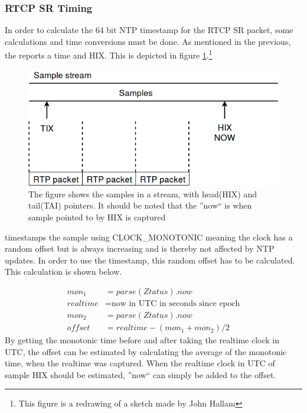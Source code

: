 \subsubsection{RTCP SR Timing} \label{sec:design:rtcpsr}
In order to calculate the 64 bit NTP timestamp for the RTCP SR packet, some calculations and time conversions must be done. As mentioned in the previous, the  reports a time and \ac{HIX}. This is depicted in figure \ref{fig:implementation:rtcpsr}.\footnote{This figure is a redrawing of a sketch made by John Hallam}
\begin{figure}[H]
	\centering
	\includegraphics[width=\textwidth]{figures/rtcp_sr_timing}
	\caption{The figure shows the samples in a stream, with head(HIX) and tail(TAI) pointers. It should be noted that the ''now`` is when sample pointed to by HIX is captured}\label{fig:implementation:rtcpsr}
\end{figure}

 timestamps the sample using CLOCK\_MONOTONIC meaning the clock has a random offset but is always increasing and is thereby not affected by \ac{NTP} updates. In order to use the timestamp, this random offset has to be calculated. This calculation is shown below.

\begin{align}
	mon_1 &= parse(Ztatus).now \\
	realtime &= \text{now in UTC in seconds since epoch} \\
	mon_2 &= parse(Ztatus).now \\
	offset &= realtime-(mon_1+mon_2)/2 
\end{align}
By getting the monotonic time before and after taking the realtime clock in UTC, the offset can be estimated by calculating the average of the monotonic time, when the realtime was captured. When the realtime clock in UTC of sample HIX should be estimated, ''now`` can simply be added to the offset. 


